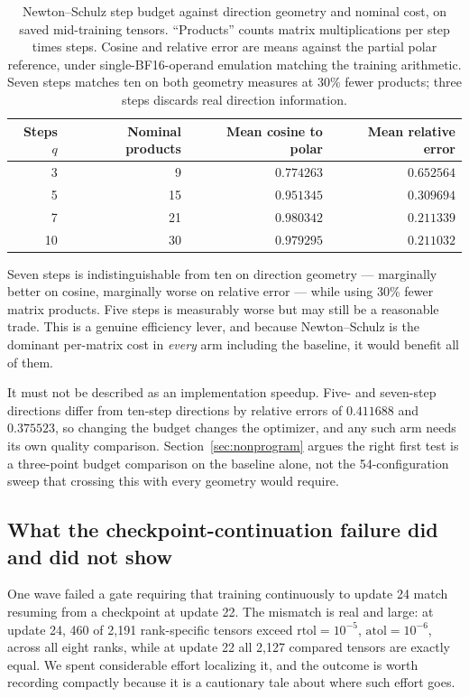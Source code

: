 \begin{table}[!ht]
\centering
\caption{Newton--Schulz step budget against direction geometry and nominal
cost, on saved mid-training tensors. ``Products'' counts matrix multiplications
per step times steps. Cosine and relative error are means against the partial
polar reference, under single-BF16-operand emulation matching the training
arithmetic. Seven steps matches ten on both geometry measures at 30\% fewer
products; three steps discards real direction information.}
\label{tab:nsbudget}
\footnotesize
\begin{tabular}{rrrr}
\toprule
Steps $q$ & Nominal products & Mean cosine to polar & Mean relative error \\
\midrule
3 & 9 & $0.774263$ & $0.652564$ \\
5 & 15 & $0.951345$ & $0.309694$ \\
7 & 21 & $\mathbf{0.980342}$ & $\mathbf{0.211339}$ \\
10 & 30 & $0.979295$ & $0.211032$ \\
\bottomrule
\end{tabular}
\end{table}

Seven steps is indistinguishable from ten on direction geometry --- marginally
better on cosine, marginally worse on relative error --- while using 30\% fewer
matrix products. Five steps is measurably worse but may still be a reasonable
trade. This is a genuine efficiency lever, and because Newton--Schulz is the
dominant per-matrix cost in \emph{every} arm including the baseline, it would
benefit all of them.

It must not be described as an implementation speedup. Five- and seven-step
directions differ from ten-step directions by relative errors of $0.411688$ and
$0.375523$, so changing the budget changes the optimizer, and any such arm needs
its own quality comparison. Section~\ref{sec:nonprogram} argues the right first
test is a three-point budget comparison on the baseline alone, not the
54-configuration sweep that crossing this with every geometry would require.

\subsection{What the checkpoint-continuation failure did and did not show}

One wave failed a gate requiring that training continuously to update 24 match
resuming from a checkpoint at update 22. The mismatch is real and large: at
update 24, 460 of 2{,}191 rank-specific tensors exceed
$\text{rtol}=10^{-5}$, $\text{atol}=10^{-6}$, across all eight ranks, while at
update 22 all 2{,}127 compared tensors are exactly equal. We spent
considerable effort localizing it, and the outcome is worth recording compactly
because it is a cautionary tale about where such effort goes.

